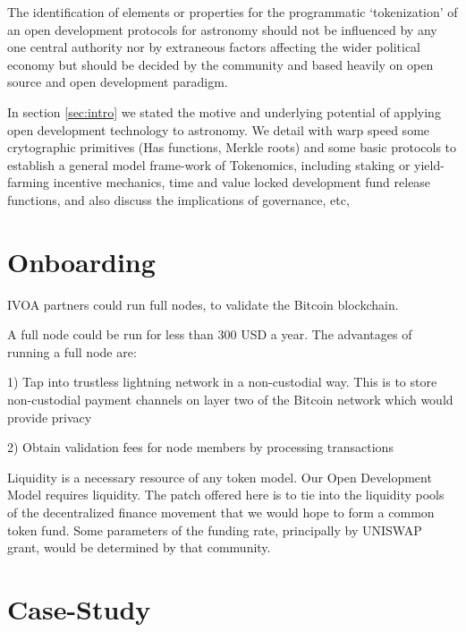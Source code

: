 \documentclass[final,5p,times,twocolumn,authoryear]{elsarticle}
\begin{document}
The identification of elements or properties for the programmatic `tokenization' of an open development protocols for astronomy should not be influenced by any one central authority nor by extraneous factors affecting the wider political economy but should be decided by the community and based heavily on open source and open development paradigm. 
   
In section \ref{sec:intro} we stated the motive and underlying potential of applying open development technology to astronomy. We detail with warp speed some crytographic primitives (Has functions, Merkle roots) and some basic protocols to establish a general model frame-work of Tokenomics, including staking or yield-farming incentive mechanics, time and value locked development fund release functions, and also discuss the implications of governance, etc,

\section{Onboarding}
\label{sec:use-case}

IVOA partners could run full nodes, to validate the Bitcoin blockchain.

A full node could be run for less than 300 USD a year. The advantages of running a full node are:

1) Tap into trustless lightning network in a non-custodial way. This is to store non-custodial payment channels on layer two of the Bitcoin network which would provide privacy 

2) Obtain validation fees for node members by processing transactions


Liquidity is a necessary resource of any token model. Our Open Development Model requires liquidity. The patch offered here is to tie into the liquidity pools of the decentralized finance movement that we would hope to form a common token fund. Some parameters of the funding rate, principally by UNISWAP grant, would be determined by that community.   

\section{Case-Study}
\label{sec:btc5}
\end{document}
